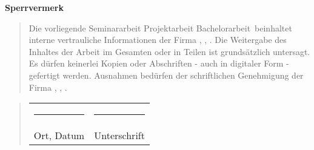 \begin{titlepage}
	\begin{center}
		\vspace*{1cm}
		\Huge\bf Sperrvermerk\\
		\vspace*{2cm}
		\normalsize\rm
		\begin{quotation}
			\parbox{0.8\textwidth}{Die vorliegende \ifcase\myType Seminararbeit \or Projektarbeit \or Bachelorarbeit\else\fi ~beinhaltet interne vertrauliche Informationen der Firma \myCompany, \myCompanyAddressStreet, \myCompanyAddressCity. Die Weitergabe des Inhaltes der Arbeit im Gesamten oder in Teilen ist grundsätzlich untersagt. Es dürfen keinerlei Kopien oder Abschriften - auch in digitaler Form - gefertigt werden. Ausnahmen bedürfen der schriftlichen Genehmigung der Firma \myCompany, \myCompanyAddressStreet, \myCompanyAddressCity.}
		\end{quotation}
		\vspace*{1cm}
		\begin{quotation}
		  \parbox{0.8\textwidth}{
		  \begin{tabularx}{0.78\textwidth}{l@{\extracolsep\fill}l}
				\rule{4cm}{0.3mm}&\rule{4cm}{0.3mm}\\
	    	Ort, Datum&Unterschrift
			\end{tabularx}}
		\end{quotation}
	\end{center}
\end{titlepage}
\newpage
\setcounter{page}{3}
